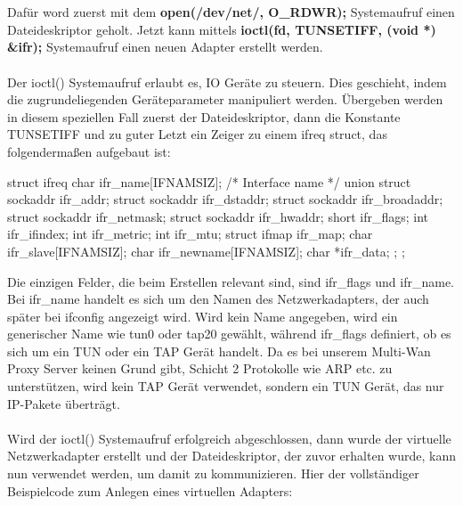 \\\\
Dafür word zuerst mit dem \textbf{open(\dq/dev/net/\dq, O\_RDWR);} Systemaufruf einen Dateideskriptor geholt. Jetzt kann mittels \textbf{ioctl(fd, TUNSETIFF, (void *) \&ifr);} Systemaufruf einen neuen Adapter erstellt werden.
\\\\
Der ioctl() Systemaufruf erlaubt es, IO Geräte zu steuern. Dies geschieht, indem die zugrundeliegenden Geräteparameter manipuliert werden. Übergeben werden in diesem speziellen Fall zuerst der Dateideskriptor, dann die Konstante TUNSETIFF und zu guter Letzt ein Zeiger zu einem ifreq struct, das folgendermaßen aufgebaut ist:

\begin{program}[H]
    \begin{CppCode}
        struct ifreq {
            char ifr_name[IFNAMSIZ]; /* Interface name */
            union {
                struct sockaddr ifr_addr;
                struct sockaddr ifr_dstaddr;
                struct sockaddr ifr_broadaddr;
                struct sockaddr ifr_netmask;
                struct sockaddr ifr_hwaddr;
                short           ifr_flags;
                int             ifr_ifindex;
                int             ifr_metric;
                int             ifr_mtu;
                struct ifmap    ifr_map;
                char            ifr_slave[IFNAMSIZ];
                char            ifr_newname[IFNAMSIZ];
                char           *ifr_data;
            };
        };
    \end{CppCode}
\end{program}
\noindent
Die einzigen Felder, die beim Erstellen relevant sind, sind ifr\_flags und ifr\_name. Bei ifr\_name handelt es sich um den Namen des Netzwerkadapters, der auch später bei ifconfig angezeigt wird. Wird kein Name angegeben, wird ein generischer Name wie tun0 oder tap20 gewählt, während ifr\_flags definiert, ob es sich um ein TUN oder ein TAP Gerät handelt. Da es bei unserem Multi-Wan Proxy Server keinen Grund gibt, Schicht 2 Protokolle wie ARP etc. zu unterstützen, wird kein TAP Gerät verwendet, sondern ein TUN Gerät, das nur IP-Pakete überträgt. 
\\\\ 
Wird der ioctl() Systemaufruf erfolgreich abgeschlossen, dann wurde der virtuelle Netzwerkadapter erstellt und der Dateideskriptor, der zuvor erhalten wurde, kann nun verwendet werden, um damit zu kommunizieren. Hier der vollständiger Beispielcode zum Anlegen eines virtuellen Adapters:
